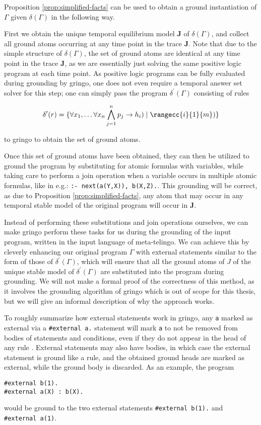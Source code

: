 Proposition \ref{prop:simplified-facts} can be used to obtain a ground
instantiation of $\Gamma$ given $\delta(\Gamma)$ in the following
way. 

First we obtain the unique temporal equilibrium model $\bm{J}$ of
$\delta(\Gamma)$, and collect all ground atoms occurring at any time
point in the trace $\bm{J}$. Note that due to the simple structure of
$\delta(\Gamma)$, the set of ground atoms are identical at any time
point in the trace $\bm{J}$, as we are essentially just solving the same
positive logic program at each time point. As positive logic programs
can be fully evaluated during grounding by gringo, one does not even
require a temporal answer set solver for this step; one can simply
pass the program $\delta^{\prime}(\Gamma)$ consisting of rules

\begin{equation*} \delta^{\prime}(r) =\{ \forall x_1, \dots \forall x_n
  \bigwedge_{j=1}^{n}p_j \rightarrow h_i) \mid \rangecc{i}{1}{m})\}
\end{equation*}

to gringo to obtain the set of ground atoms.

Once this set of ground atoms have been obtained, they can then be
utilized to ground the program by substituting for atomic formulas
with variables, while taking care to perform a join operation when a
variable occurs in multiple atomic formulas, like in e.g.:
\verb|:- next(a(Y,X)), b(X,Z).|. This grounding will be correct, as due to
Proposition \ref{prop:simplified-facts}, any atom that may occur in
any temporal stable model of the original program will occur in
$\bm{J}$.

Instead of performing these substitutions and join operations
ourselves, we can make gringo perform these tasks for us during the
grounding of the input program, written in the input language of
meta-telingo. We can achieve this by cleverly enhancing our original
program $\Gamma$ with external statements similar to the form of those
of $\delta^\prime(\Gamma)$, which will ensure that all the ground
atoms of $J$ of the unique stable model of $\delta^\prime(\Gamma)$ are
substituted into the program during grounding. We will not make a
formal proof of the correctness of this method, as it involves the
grounding algorithm of gringo which is out of scope for this thesis,
but we will give an informal description of why the approach works.

To roughly summarize how external statements work in gringo, any
\verb|a| marked as external via a \verb|#external a.| statement will
mark \verb|a| to not be removed from bodies of statements and
conditions, even if they do not appear in the head of any rule
\cite{PotasscoUserGuide19}. External statements may also have bodies,
in which case the external statement is ground like a rule, and the
obtained ground heads are marked as external, while the ground body is
discarded. As an example, the program
\begin{lstlisting}[language=clingo]
#external b(1).
#external a(X) : b(X).
\end{lstlisting}
would be ground to the two external statements \verb|#external b(1).|
and \\\verb|#external a(1)|.

